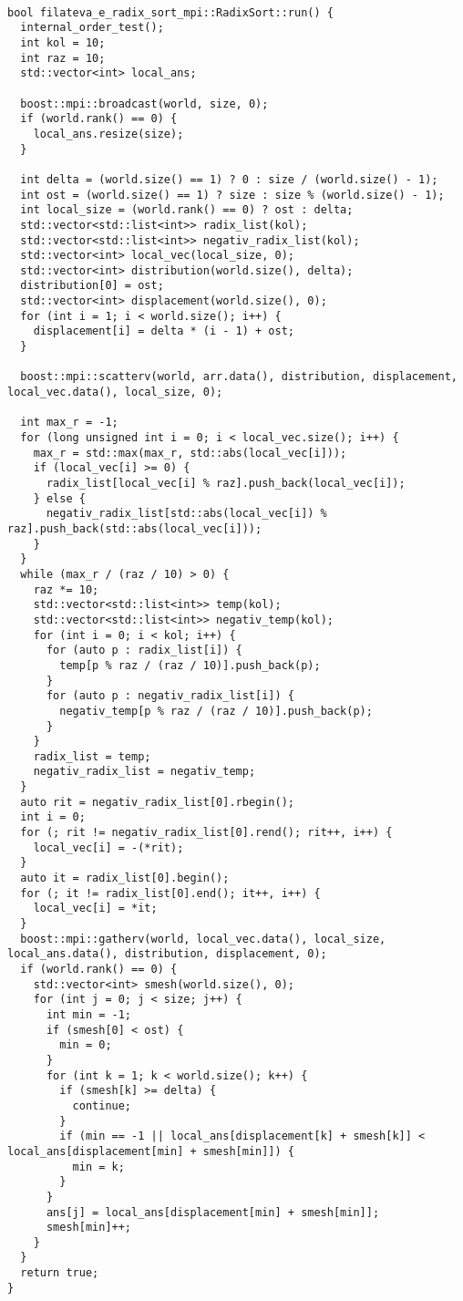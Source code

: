 \documentclass[a4paper, 14pt]{article}
\begin{document}
	\vspace{-1em}
	\begin{verbatim}

bool filateva_e_radix_sort_mpi::RadixSort::run() {
  internal_order_test();
  int kol = 10;
  int raz = 10;
  std::vector<int> local_ans;

  boost::mpi::broadcast(world, size, 0);
  if (world.rank() == 0) {
    local_ans.resize(size);
  }

  int delta = (world.size() == 1) ? 0 : size / (world.size() - 1);
  int ost = (world.size() == 1) ? size : size % (world.size() - 1);
  int local_size = (world.rank() == 0) ? ost : delta;
  std::vector<std::list<int>> radix_list(kol);
  std::vector<std::list<int>> negativ_radix_list(kol);
  std::vector<int> local_vec(local_size, 0);
  std::vector<int> distribution(world.size(), delta);
  distribution[0] = ost;
  std::vector<int> displacement(world.size(), 0);
  for (int i = 1; i < world.size(); i++) {
    displacement[i] = delta * (i - 1) + ost;
  }

  boost::mpi::scatterv(world, arr.data(), distribution, displacement, local_vec.data(), local_size, 0);

  int max_r = -1;
  for (long unsigned int i = 0; i < local_vec.size(); i++) {
    max_r = std::max(max_r, std::abs(local_vec[i]));
    if (local_vec[i] >= 0) {
      radix_list[local_vec[i] % raz].push_back(local_vec[i]);
    } else {
      negativ_radix_list[std::abs(local_vec[i]) % raz].push_back(std::abs(local_vec[i]));
    }
  }
  while (max_r / (raz / 10) > 0) {
    raz *= 10;
    std::vector<std::list<int>> temp(kol);
    std::vector<std::list<int>> negativ_temp(kol);
    for (int i = 0; i < kol; i++) {
      for (auto p : radix_list[i]) {
        temp[p % raz / (raz / 10)].push_back(p);
      }
      for (auto p : negativ_radix_list[i]) {
        negativ_temp[p % raz / (raz / 10)].push_back(p);
      }
    }
    radix_list = temp;
    negativ_radix_list = negativ_temp;
  }
  auto rit = negativ_radix_list[0].rbegin();
  int i = 0;
  for (; rit != negativ_radix_list[0].rend(); rit++, i++) {
    local_vec[i] = -(*rit);
  }
  auto it = radix_list[0].begin();
  for (; it != radix_list[0].end(); it++, i++) {
    local_vec[i] = *it;
  }
  boost::mpi::gatherv(world, local_vec.data(), local_size, local_ans.data(), distribution, displacement, 0);
  if (world.rank() == 0) {
    std::vector<int> smesh(world.size(), 0);
    for (int j = 0; j < size; j++) {
      int min = -1;
      if (smesh[0] < ost) {
        min = 0;
      }
      for (int k = 1; k < world.size(); k++) {
        if (smesh[k] >= delta) {
          continue;
        }
        if (min == -1 || local_ans[displacement[k] + smesh[k]] < local_ans[displacement[min] + smesh[min]]) {
          min = k;
        }
      }
      ans[j] = local_ans[displacement[min] + smesh[min]];
      smesh[min]++;
    }
  }
  return true;
}


    \end{verbatim}	
\end{document}
